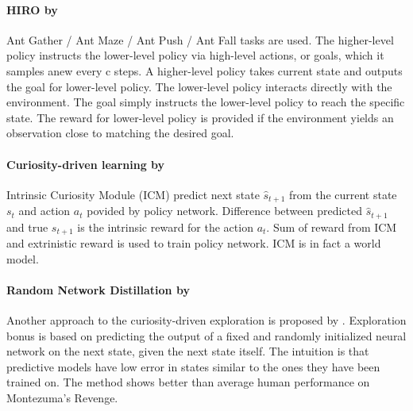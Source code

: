 \documentclass[acmsmall, nonacm]{acmart}
\begin{document}
\paragraph{HIRO by~\citet{Nachum2018DataEfficientHR}} %
\label{par:hiro}

Ant Gather / Ant Maze / Ant Push / Ant Fall tasks are used. The higher-level policy instructs the lower-level policy via high-level actions, or goals, which it samples anew every c steps. A higher-level policy takes current state and outputs the goal for lower-level policy. The lower-level policy interacts directly with the environment. The goal simply instructs the lower-level policy to reach the specific state. The reward for lower-level policy is provided if the environment yields an observation close to matching the desired goal.


\paragraph{Curiosity-driven learning by~\citet{pathak_curiosity-driven_2017}} %
\label{par:curiosity_driven_rl}

Intrinsic Curiosity Module (ICM) predict next state $\hat{s}_{t+1}$ from the current state $s_t$ and action $a_t$ povided by policy network. Difference between predicted $\hat{s}_{t+1}$ and true $s_{t+1}$ is the intrinsic reward for the action $a_t$. Sum of reward from ICM and extrinistic reward is used to train policy network. ICM is in fact a world model.


\paragraph{Random Network Distillation by~\citet{burda_exploration_2019}} %
\label{par:random_distillation}

Another approach to the curiosity-driven exploration is proposed by \citep{burda_exploration_2019}. Exploration bonus is based on predicting the output of a fixed and randomly initialized neural network on the next state, given the next state itself. The intuition is that predictive models have low error in states similar to the ones they have been trained on. The method shows better than average human performance on Montezuma’s Revenge.

\end{document}
